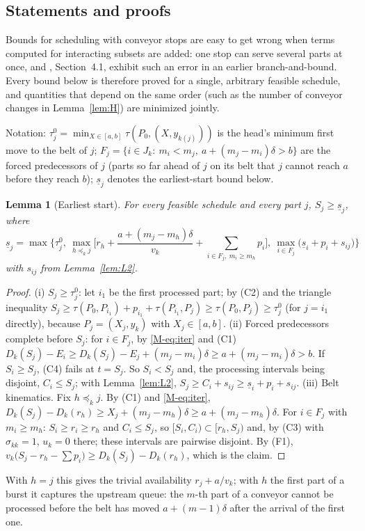 \documentclass[11pt,a4paper]{article}
\theoremstyle{plain}
\newtheorem{lemma}{Lemma}
\theoremstyle{definition}
\theoremstyle{remark}
\begin{document}
\subsection{Statements and proofs}
Bounds for scheduling with conveyor stops are easy to get wrong when terms computed for
interacting subsets are added: one stop can serve several parts at once, and
\cite{Tamura2011}, Section~4.1, exhibit such an error in an earlier branch-and-bound. Every
bound below is therefore proved for a single, arbitrary feasible schedule, and quantities
that depend on the same order (such as the number of conveyor changes in Lemma~\ref{lem:H})
are minimized jointly.

Notation: $\tau^0_j=\min_{X\in[a,b]}\tau(P_0,(X,y_{k(j)}))$ is the head's minimum first
move to the belt of $j$; $F_j=\{i\in J_k:\ m_i<m_j,\ a+(m_j-m_i)\delta>b\}$ are the forced
predecessors of $j$ (parts so far ahead of $j$ on its belt that $j$ cannot reach $a$ before
they reach $b$); $\underline s_j$ denotes the earliest-start bound below.

\begin{lemma}[Earliest start]\label{lem:L1}
For every feasible schedule and every part $j$, $S_j\ge\underline s_j$, where
\[
\underline s_j=\max\Big\{\tau^0_j,\
\max_{h\preceq_k j}\Big[r_h+\frac{a+(m_j-m_h)\delta}{v_k}+\sum_{i\in F_j,\ m_i\ge m_h}p_i\Big],\
\max_{i\in F_j}\bigl(\underline s_i+p_i+s_{ij}\bigr)\Big\}
\]
with $s_{ij}$ from Lemma~\ref{lem:L2}.
\end{lemma}
\begin{proof}
(i) $S_j\ge\tau^0_j$: let $i_1$ be the first processed part; by (C2) and the triangle
inequality $S_j\ge\tau(P_0,P_{i_1})+p_{i_1}+\tau(P_{i_1},P_j)\ge\tau(P_0,P_j)\ge\tau^0_j$
(for $j=i_1$ directly), because $P_j=(X_j,y_k)$ with $X_j\in[a,b]$. (ii) Forced
predecessors complete before $S_j$: for $i\in F_j$, by \eqref{M-eq:iter} and (C1)
$D_k(S_j)-E_i\ge D_k(S_j)-E_j+(m_j-m_i)\delta\ge a+(m_j-m_i)\delta>b$. If $S_i\ge S_j$,
(C4) fails at $t=S_j$. So $S_i<S_j$ and, the processing intervals being disjoint,
$C_i\le S_j$; with Lemma~\ref{lem:L2}, $S_j\ge C_i+s_{ij}\ge\underline s_i+p_i+s_{ij}$.
(iii) Belt kinematics. Fix $h\preceq_k j$. By (C1) and \eqref{M-eq:iter},
$D_k(S_j)-D_k(r_h)\ge X_j+(m_j-m_h)\delta\ge a+(m_j-m_h)\delta$. For $i\in F_j$ with
$m_i\ge m_h$: $S_i\ge r_i\ge r_h$ and $C_i\le S_j$, so $[S_i,C_i)\subset[r_h,S_j)$ and, by
(C3) with $\sigma_{kk}=1$, $u_k=0$ there; these intervals are pairwise disjoint. By (F1),
$v_k\bigl(S_j-r_h-\sum p_i\bigr)\ge D_k(S_j)-D_k(r_h)$, which is the claim.
\end{proof}
With $h=j$ this gives the trivial availability $r_j+a/v_k$; with $h$ the first part of a
burst it captures the upstream queue: the $m$-th part of a conveyor cannot be processed
before the belt has moved $a+(m-1)\delta$ after the arrival of the first one.
\end{document}
